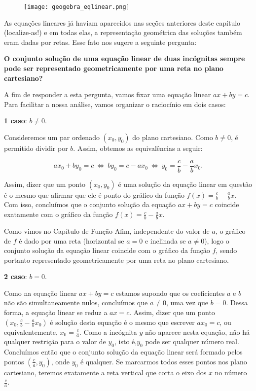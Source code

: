 \begin{figure}[H]
\centering

\noindent\texttt{[image: geogebra\_eqlinear.png]}
\end{figure}
\vspace{-2em}

As equações lineares já haviam aparecidos nas seções anteriores deste capítulo (localize-as!) e em todas elas, a representação geométrica das soluções também eram dadas por retas. Esse fato nos sugere a seguinte pergunta:	


\begin{observation}{}

\textbf{O conjunto solução de uma equação linear de duas incógnitas sempre pode ser representado geometricamente por uma reta no plano cartesiano?}


A fim de responder a esta pergunta, vamos fixar uma equação linear $ax + by = c$. Para facilitar a nossa análise, vamos organizar o raciocínio em dois casos:

\textbf{1 caso}: $b\neq 0$.  

Consideremos um par ordenado $(x_0,y_0)$ do plano cartesiano. Como $b \neq 0$, é permitido dividir por $b$. Assim, obtemos as equivalências a seguir:

$$
ax_0+by_0=c \ \Leftrightarrow \ by_0=c-ax_0 \ \Leftrightarrow \ y_0=\frac{c}{b}-\frac{a}{b}x_0.
$$

Assim, dizer que um ponto $(x_0,y_0)$ é uma solução da equação linear em questão é o mesmo que afirmar que ele é ponto do gráfico da função $f(x)=\frac{c}{b}-\frac{a}{b}x$. Com isso, concluímos que o conjunto solução da equação $ax+by=c$ coincide exatamente com o gráfico da função $f(x)=\frac{c}{b}-\frac{a}{b}x$.
	

Como vimos no Capítulo de Função Afim, independente do valor de $a$, o gráfico de $f$ é dado por uma reta (horizontal se $a =0$ e inclinada se $a\neq 0$), logo o conjunto solução da equação linear coincide com o gráfico da função $f$, sendo portanto representado geometricamente por uma reta no plano cartesiano.


\textbf{2 caso}: $b=0$.  

Como na equação linear $ax + by = c$ estamos supondo que os coeficientes $a$ e $b$ não são simultaneamente nulos, concluímos que $a\neq0$, uma vez que $b=0$. Dessa forma, a equação linear se reduz a $ax = c$. Assim, dizer que um ponto $(x_0,\frac{c}{b}-\frac{a}{b}x_0)$ é solução desta equação é o mesmo que escrever $ax_0=c$, ou equivalentemente, $x_0=\frac{c}{a}$. Como a incógnita $y$ não aparece nesta equação, não há qualquer restrição para o valor de $y_0$, isto é,$y_0$ pode ser qualquer número real. Concluímos então que o conjunto solução da equação linear será formado pelos pontos $(\frac{c}{a},y_0)$, onde $ y_0$ é qualquer. Se marcarmos todos esses pontos nos plano cartesiano, teremos exatamente a reta vertical que corta o eixo dos $x$ no número $\frac{c}{a}$.


\end{observation}
